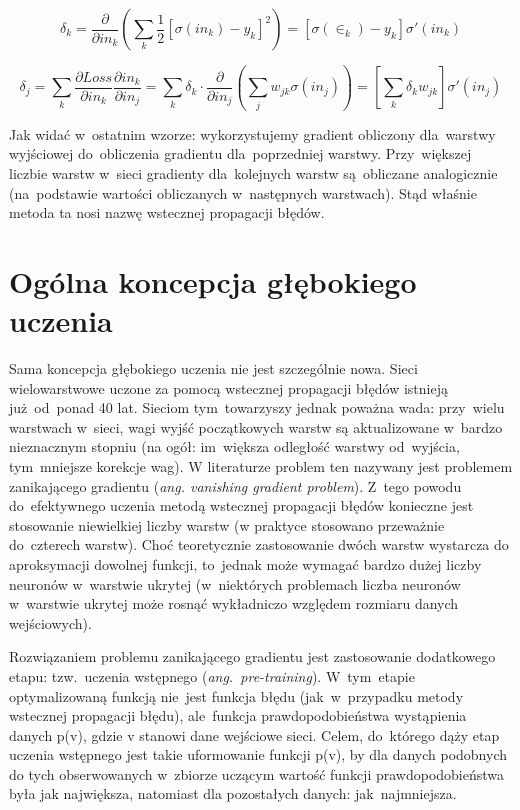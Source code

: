 $$ \delta_k = \frac{\partial}{\partial in_k}(\sum\limits_k \frac{1}{2}
[\sigma(in_k)-y_k]^2)=[\sigma(\in_k)-y_k]\sigma'(in_k)$$

$$ \delta_j = \sum\limits_k\frac{\partial Loss}{\partial in_k}\frac{\partial in_k}{\partial
in_j}=\sum\limits_k \delta_k \cdot \frac{\partial}{\partial in_j}(\sum\limits_j w_{jk}\sigma(in_j))=[\sum\limits_k \delta_k
w_{jk}]\sigma'(in_j)$$

Jak widać w~ostatnim wzorze: wykorzystujemy gradient obliczony dla~warstwy wyjściowej
do~obliczenia gradientu dla~poprzedniej warstwy. Przy~większej liczbie warstw w~sieci gradienty
dla~kolejnych warstw są~obliczane analogicznie (na~podstawie wartości obliczanych w~następnych warstwach).
Stąd właśnie metoda ta nosi nazwę wstecznej propagacji błędów.


\section{Ogólna koncepcja głębokiego uczenia}
Sama koncepcja głębokiego uczenia nie jest szczególnie nowa. Sieci
wielowarstwowe uczone za pomocą wstecznej propagacji błędów istnieją
już~od~ponad 40 lat. Sieciom tym~towarzyszy jednak poważna wada: przy~wielu
warstwach w~sieci, wagi wyjść początkowych warstw są aktualizowane w~bardzo
nieznacznym stopniu (na ogół: im~większa odległość warstwy od~wyjścia,
tym~mniejsze korekcje wag). W literaturze problem ten nazywany jest problemem
zanikającego gradientu (\textit{ang. vanishing gradient problem}). Z~tego
powodu do~efektywnego uczenia metodą wstecznej propagacji błędów konieczne jest
stosowanie niewielkiej liczby warstw (w praktyce stosowano przeważnie
do~czterech warstw). Choć teoretycznie zastosowanie dwóch warstw
wystarcza do aproksymacji dowolnej funkcji, to~jednak może wymagać bardzo dużej
liczby neuronów w~warstwie ukrytej (w~niektórych problemach liczba neuronów w~warstwie ukrytej może rosnąć
wykładniczo względem rozmiaru danych wejściowych).

Rozwiązaniem problemu zanikającego gradientu jest zastosowanie dodatkowego
etapu: tzw.~uczenia wstępnego (\textit{ang.~pre-training}). W~tym~etapie
optymalizowaną funkcją nie~jest funkcja błędu (jak~w~przypadku metody wstecznej
propagacji błędu), ale~funkcja prawdopodobieństwa wystąpienia danych p(v),
gdzie v stanowi dane wejściowe sieci. Celem, do~którego dąży etap uczenia
wstępnego jest takie uformowanie funkcji p(v), by dla danych podobnych do tych obserwowanych w~zbiorze
uczącym wartość funkcji prawdopodobieństwa była jak największa, natomiast dla pozostałych danych:
jak~najmniejsza.

